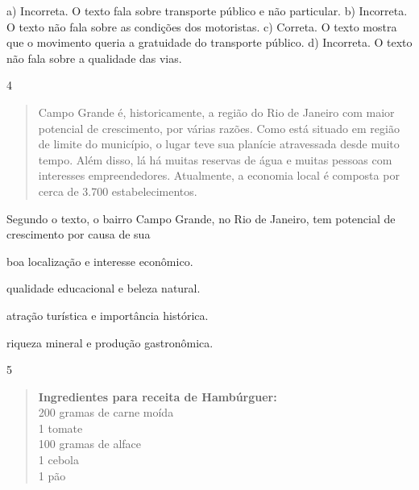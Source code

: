 \begin{itemize}
\begin{itemize}
\begin{itemize}
\begin{itemize}
{{\begin{itemize}
\begin{itemize}
{a) Incorreta. O texto fala sobre transporte público e não particular.
b) Incorreta. O texto não fala sobre as condições dos motoristas.
c) Correta. O texto mostra que o movimento queria a gratuidade do
transporte público.
d) Incorreta. O texto não fala sobre a qualidade das vias.}

\num{4}

\begin{quote}
Campo Grande é, historicamente, a região do Rio de Janeiro com maior
potencial de crescimento, por várias razões. Como está situado em região de limite do município, o lugar teve sua planície atravessada desde muito tempo. Além disso, lá há muitas reservas de água e muitas pessoas com interesses empreendedores. Atualmente, a economia local é composta por cerca de 3.700 estabelecimentos. 
\end{quote}

Segundo o texto, o bairro Campo Grande, no Rio de Janeiro, tem potencial
de crescimento por causa de sua

\begin{escolha}
\item boa localização e interesse econômico.

\item qualidade educacional e beleza natural.

\item atração turística e importância histórica.

\item riqueza mineral e produção gastronômica.
\end{escolha}


\num{5}

\begin{quote}
\textbf{Ingredientes para receita de Hambúrguer:}\\
200 gramas de carne moída\\
1 tomate\\
100 gramas de alface\\
1 cebola\\
1 pão
\end{quote}


\end{itemize}
\end{itemize}}}
\end{itemize}
\end{itemize}
\end{itemize}
\end{itemize}

